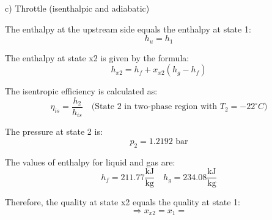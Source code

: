 c) Throttle (isenthalpic and adiabatic)

The enthalpy at the upstream side equals the enthalpy at state 1:
\[ h_u = h_1 \]

The enthalpy at state x2 is given by the formula:
\[ h_{x2} = h_f + x_{x2} (h_g - h_f) \]

The isentropic efficiency is calculated as:
\[ \eta_{is} = \frac{h_2}{h_{is}} \quad \text{(State 2 in two-phase region with } T_2 = -22^\circ C) \]

The pressure at state 2 is:
\[ p_2 = 1.2192 \text{ bar} \]

The values of enthalpy for liquid and gas are:
\[ h_f = 211.77 \frac{\text{kJ}}{\text{kg}} \quad h_g = 234.08 \frac{\text{kJ}}{\text{kg}} \]

Therefore, the quality at state x2 equals the quality at state 1:
\[ \Rightarrow x_{x2} = x_1 = \]